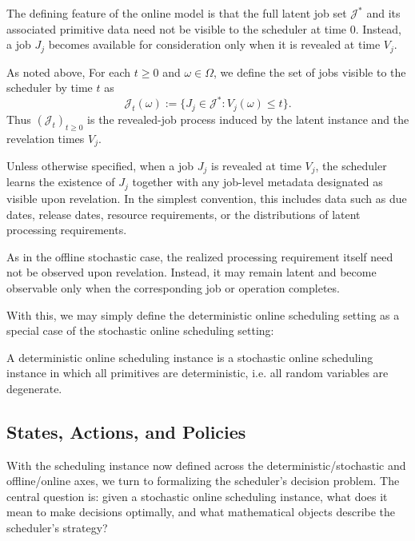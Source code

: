 \begin{definition}
The defining feature of the online model is that the full latent job set \(\mathcal J^\ast\) and its associated primitive data need not be visible to the scheduler at time \(0\). Instead, a job \(J_j\) becomes available for consideration only when it is revealed at time \(V_j\).
\end{definition}

\begin{remark}
As noted above, For each \(t\ge 0\) and \(\omega\in\Omega\), we define the set of jobs visible to the scheduler by time \(t\) as
\[
\mathcal J_t(\omega):=\{J_j\in\mathcal J^\ast : V_j(\omega)\le t\}.
\]
Thus \((\mathcal J_t)_{t\ge 0}\) is the revealed-job process induced by the latent instance and the revelation times \(V_j\).
\end{remark}

\begin{remark}
Unless otherwise specified, when a job \(J_j\) is revealed at time \(V_j\), the scheduler learns the existence of \(J_j\) together with any job-level metadata designated as visible upon revelation. In the simplest convention, this includes data such as due dates, release dates, resource requirements, or the distributions of latent processing requirements.

As in the offline stochastic case, the realized processing requirement itself need not be observed upon revelation. Instead, it may remain latent and become observable only when the corresponding job or operation completes.
\end{remark}

With this, we may simply define the deterministic online scheduling setting as a special case of the stochastic online scheduling setting:
\begin{definition}
A deterministic online scheduling instance is a stochastic online scheduling instance in which all primitives are deterministic, i.e. all random variables are degenerate.
\end{definition}

\subsection{States, Actions, and Policies}

With the scheduling instance now defined across the deterministic/stochastic and
offline/online axes, we turn to formalizing the scheduler's decision problem. The central
question is: given a stochastic online scheduling instance, what does it mean to make
decisions optimally, and what mathematical objects describe the scheduler's strategy?

